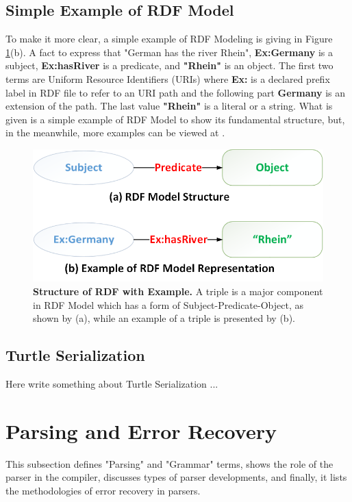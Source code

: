 \subsection{Simple Example of RDF Model}

To make it more clear, a simple example of RDF Modeling is giving in Figure \ref{Fig:rdfModel}(b). A fact to express that "German has the river Rhein", \textbf{Ex:Germany} is a subject, \textbf{Ex:hasRiver} is a predicate, and \textbf{"Rhein"} is an object. The first two terms are Uniform Resource Identifiers (URIs) where \textbf{Ex:} is a declared prefix label in RDF file to refer to an URI path and the following part \textbf{Germany} is an extension of the path. The last value \textbf{"Rhein"} is a literal or a string. What is given is a simple example of RDF Model to show its fundamental structure, but, in the meanwhile, more examples can be viewed at \cite{W3C:RDF-Primer:Online}.

\begin{figure}[ht]
	\begin{center}
		\includegraphics[scale=0.4,angle=0]{images/RDF-Model}
		\caption{\textbf{ Structure of RDF with Example.} A triple is a major component in RDF Model which has a form of Subject-Predicate-Object, as shown by (a), while an example of a triple is presented by (b).}
		\label{Fig:rdfModel}
	\end{center}
\end{figure}

\subsection{Turtle Serialization}
Here write something about Turtle Serialization ...

\section{Parsing and Error Recovery}
\label{sec:bck_parser}
This subsection defines "Parsing" and "Grammar" terms, shows the role of the parser in the compiler, discusses types of parser developments, and finally, it lists the methodologies of error recovery in parsers. 
